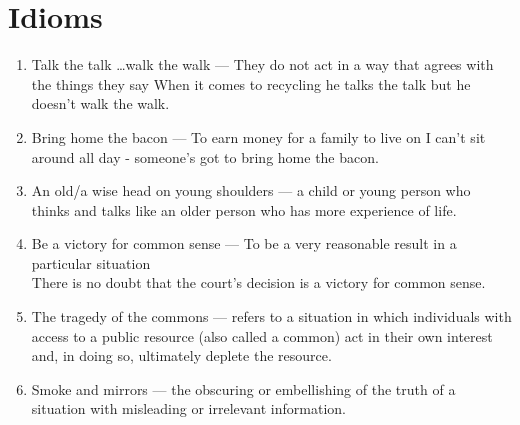 \documentclass[oneside]{book}
\begin{document}
\section{Idioms}
\begin{enumerate}
    \item Talk the talk \ldots walk the walk --- They do not act in a way that agrees with the things they say
    \footnotesize When it comes to recycling he talks the talk but he doesn't walk the walk. \normalsize
    \item Bring home the bacon --- To earn money for a family to live on \footnotesize I can't sit around all day - someone's got to bring home the bacon. \normalsize
    \item An old/a wise head on young shoulders --- a child or young person who thinks and talks like an older person who has more experience of life.
    \item Be a victory for common sense --- To be a very reasonable result in a particular situation\\
    \footnotesize There is no doubt that the court's decision is a victory for common sense. \normalsize
    \item The tragedy of the commons --- refers to a situation in which individuals with access to a public resource (also called a common) act in their own interest and, in doing so, ultimately deplete the resource.
    \item Smoke and mirrors --- the obscuring or embellishing of the truth of a situation with misleading or irrelevant information.
\end{enumerate}
\end{document}
